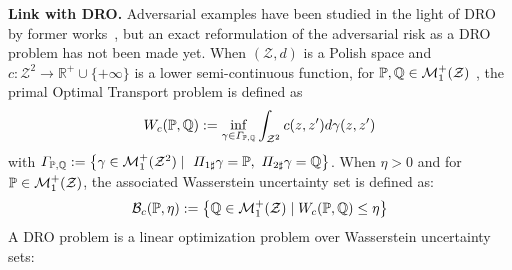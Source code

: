 \textbf{Link with DRO.} Adversarial examples have been studied in the light of DRO by former works~\citep{sinha2017certifying,tu2018theoretical}, but an exact reformulation of the adversarial risk as a DRO problem has not been made yet. %
When $(\mathcal{Z},d)$ is a Polish space and $c:\mathcal{Z}^2\rightarrow\mathbb{R}^+\cup\{+\infty\}$  is a lower semi-continuous function, for $\mathbb{P},\mathbb{Q}\in\mathcal{M}^+_1(\mathcal{Z})$ , the primal Optimal Transport problem is defined as
\begin{align*}
  W_c(\mathbb{P},\mathbb{Q}):=\inf_{\gamma\in\Gamma_{\mathbb{P},\mathbb{Q}}}  \int_{\mathcal{Z}^2} c(z,z')d\gamma(z,z')
\end{align*}
with $\Gamma_{\PP,\QQ}:=\left\{\gamma\in\mathcal{M}^+_1(\mathcal{Z}^2)\mid~\Pi_{1\sharp}\gamma = \PP,~\Pi_{2\sharp}\gamma = \QQ \right\}$. When $\eta>0$ and for $\mathbb{P}\in\mathcal{M}^+_1(\mathcal{Z})$, the associated Wasserstein uncertainty set is defined as: 
\begin{align*}
    \mathcal{B}_{c}(\PP,\eta) := \left\{\QQ\in \mathcal{M}^+_1(\mathcal{Z})\mid W_c(\PP,\QQ)\leq \eta\right\}
\end{align*}
A DRO problem is a linear optimization problem over Wasserstein uncertainty sets:

